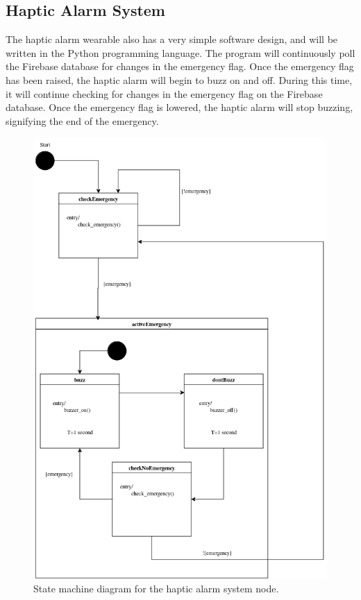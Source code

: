 \subsection{Haptic Alarm System}

The haptic alarm wearable also has a very simple software design, and will be written in the Python programming
language. The program will continuously poll the Firebase database for changes in the emergency flag. Once the
emergency flag has been raised, the haptic alarm will begin to buzz on and off. During this time, it will continue
checking for changes in the emergency flag on the Firebase database. Once the emergency flag is lowered, the haptic
alarm will stop buzzing, signifying the end of the emergency.

\begin{figure}[H]
    \centering
    \includegraphics[width=\linewidth]{../assets/HapticAlarmStateMachine.png}
    \caption{State machine diagram for the haptic alarm system node.}
\end{figure}
